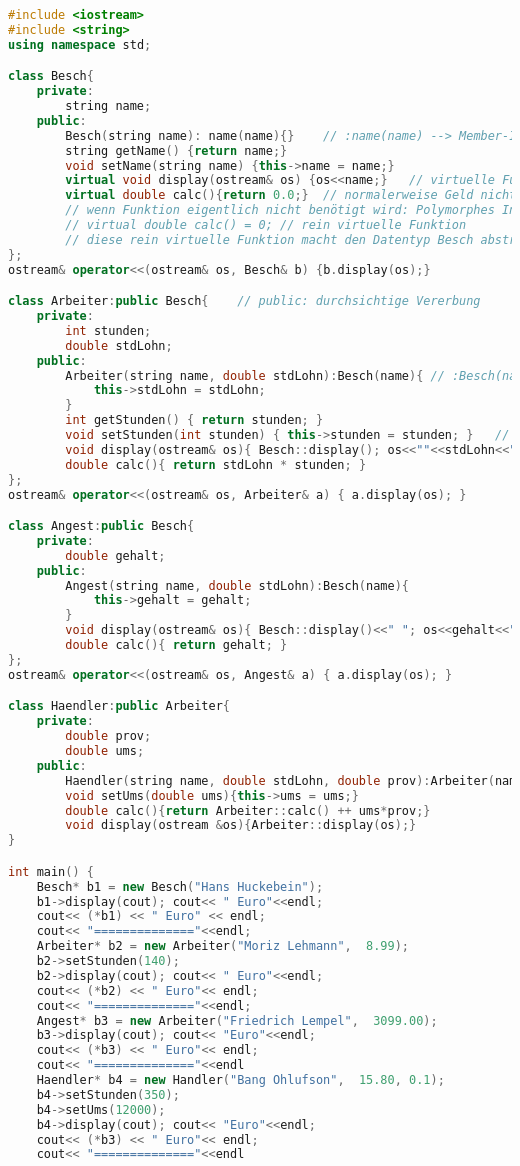 \begin{lstlisting}[language=C++]
#include <iostream>
#include <string>
using namespace std;

class Besch{
	private:
		string name;
	public:	
		Besch(string name): name(name){}	// :name(name) --> Member-Initialisierer
		string getName() {return name;}
		void setName(string name) {this->name = name;}
		virtual void display(ostream& os) {os<<name;}	// virtuelle Funktion
		virtual double calc(){return 0.0;}	// normalerweise Geld nicht mit double, sondern ganzzahlig rechnen!
		// wenn Funktion eigentlich nicht benötigt wird: Polymorphes Interface:
		// virtual double calc() = 0; // rein virtuelle Funktion
		// diese rein virtuelle Funktion macht den Datentyp Besch abstract! D.h. davon kann keine Instanz erzeugt werden (wie in der Main passiert)!
};
ostream& operator<<(ostream& os, Besch& b) {b.display(os);}

class Arbeiter:public Besch{	// public: durchsichtige Vererbung
	private:
		int stunden;
		double stdLohn;
	public:
		Arbeiter(string name, double stdLohn):Besch(name){ // :Besch(name) --> Basis-Initialisierer
			this->stdLohn = stdLohn;
		}
		int getStunden() { return stunden; }
		void setStunden(int stunden) { this->stunden = stunden; }	// usw. getter und setter
		void display(ostream& os){ Besch::display(); os<<""<<stdLohn<<" "<<stunden<<" "<<calc();}
		double calc(){ return stdLohn * stunden; }
};
ostream& operator<<(ostream& os, Arbeiter& a) { a.display(os); }

class Angest:public Besch{
	private:
		double gehalt;
	public:
		Angest(string name, double stdLohn):Besch(name){
			this->gehalt = gehalt;
		}
		void display(ostream& os){ Besch::display()<<" "; os<<gehalt<<" ";}
		double calc(){ return gehalt; }
};
ostream& operator<<(ostream& os, Angest& a) { a.display(os); }

class Haendler:public Arbeiter{
	private:
		double prov;
		double ums;
	public:
		Haendler(string name, double stdLohn, double prov):Arbeiter(name, stdLohn){this->prov=prov;};
		void setUms(double ums){this->ums = ums;}
		double calc(){return Arbeiter::calc() ++ ums*prov;}
		void display(ostream &os){Arbeiter::display(os);}
}

int main() {
	Besch* b1 = new Besch("Hans Huckebein");
	b1->display(cout); cout<< " Euro"<<endl;
	cout<< (*b1) << " Euro" << endl;
	cout<< "=============="<<endl;
	Arbeiter* b2 = new Arbeiter("Moriz Lehmann",  8.99);
	b2->setStunden(140);
	b2->display(cout); cout<< " Euro"<<endl;
	cout<< (*b2) << " Euro"<< endl;
	cout<< "=============="<<endl;
	Angest* b3 = new Arbeiter("Friedrich Lempel",  3099.00);
	b3->display(cout); cout<< "Euro"<<endl;
	cout<< (*b3) << " Euro"<< endl;
	cout<< "=============="<<endl
	Haendler* b4 = new Handler("Bang Ohlufson",  15.80, 0.1);
	b4->setStunden(350);
	b4->setUms(12000);
	b4->display(cout); cout<< "Euro"<<endl;
	cout<< (*b3) << " Euro"<< endl;
	cout<< "=============="<<endl
	

\end{lstlisting}
